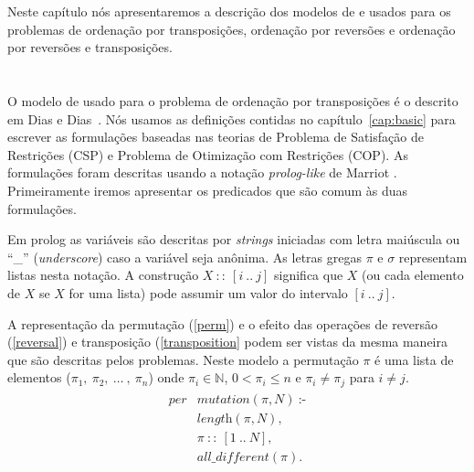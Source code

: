 Neste capítulo nós apresentaremos a descrição dos modelos de \pr{} e
\pli{} usados para os problemas de ordenação por transposições,
ordenação por reversões e ordenação por reversões e transposições.

\section{\PR}
\label{sec:cp}
O modelo de \pr{} usado para o problema de ordenação por transposições
é o descrito em Dias e Dias~\cite{DiasDias*2009}. Nós usamos as
definições contidas no capítulo~\ref{cap:basic} para escrever as
formulações baseadas nas teorias de Problema de Satisfação de
Restrições (CSP) e Problema de Otimização com Restrições (COP). As
formulações foram descritas usando a notação \textit{prolog-like} de
Marriot \cite{Marriott*1998}. Primeiramente iremos apresentar os
predicados que são comum às duas formulações.

Em prolog as variáveis são descritas por \textit{strings} iniciadas
com letra maiúscula ou ``\_'' (\textit{underscore}) caso a variável
seja anônima. As letras gregas $\pi$ e $\sigma$ representam listas
nesta notação. A construção $X~::~[i~..~j]$ significa que $X$ (ou cada
elemento de $X$ se $X$ for uma lista) pode assumir um valor do
intervalo $[i~..~j]$.

A representação da permutação (\ref{perm}) e o efeito das operações de
reversão (\ref{reversal}) e transposição (\ref{transposition} podem
ser vistas da mesma maneira que são descritas pelos problemas. Neste
modelo a permutação $\pi$ é uma lista de elementos
($\pi_{1},~\pi_{2},~\ldots~,~\pi_{n}$) onde $\pi_{i} \in \mathbb{N}$,
$0 < \pi_{i} \le n$ e $\pi_{i} \neq \pi_{j}$ para $i \neq j$.
\begin{align}
  \label{perm}
  \begin{split}
  \textit{per}&\textit{mutation}(\pi, N)~\text{:-} \\
  &\textit{length}(\pi, N), \\ 
  &\pi~::~[1~..~N], \\
  &\textit{all\_different}(\pi). 
  \end{split}
\end{align}

